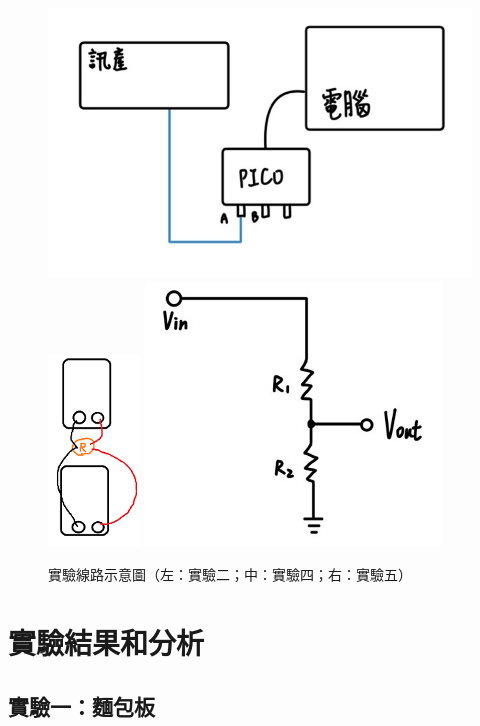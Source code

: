 \documentclass[12pt,a4paper]{article}
\begin{document}
\begin{CJK}{UTF8}{bkai}
\begin{figure}[h]
    \centering
    \includegraphics[width=0.45\linewidth]{figures/exp_2.png}
    \includegraphics[width=0.15\linewidth]{figures/exp_4.png}
    \includegraphics[width=0.3\linewidth]{figures/exp_5.jpg}
    \caption{實驗線路示意圖（左：實驗二；中：實驗四；右：實驗五）}
    \label{fig:step}
\end{figure}

\clearpage

\section{實驗結果和分析}

\subsection{實驗一：麵包板}


\end{CJK}
\end{document}
